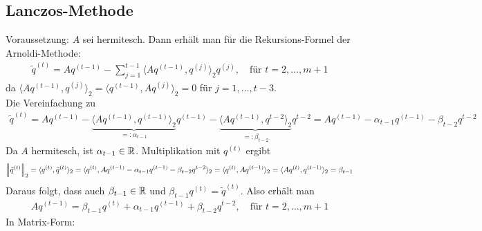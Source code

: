 \subsection{Lanczos-Methode}
Voraussetzung: $A$ sei hermitesch. Dann erhält man für die Rekursions-Formel der Arnoldi-Methode:
\begin{align*}
  \tilde{q}^{(t)} = Aq^{(t-1)} - \sum_{j=1}^{t-1} \langle Aq^{(t-1)}, q^{(j)}\rangle_2 q^{(j)}, \quad \text{für } t=2,\dots,m+1
\end{align*}
da $\langle Aq^{(t-1)}, q^{(j)}\rangle_2 = \langle q^{(t-1)}, Aq^{(j)}\rangle_2 = 0$ für $j=1,\dots,t-3$. \\
Die Vereinfachung zu 
\begin{align*}\tilde{q}^{(t)} = Aq^{(t-1)} - \underbrace{\langle Aq^{(t-1)}, q^{(t-1)}\rangle_2}_{=:\alpha_{t-1}} q^{(t-1)}
- \underbrace{\langle Aq^{(t-1)}, q^{t-2}\rangle_2}_{=:\beta_{t-2}} q^{t-2} = Aq^{(t-1)}-\alpha_{t-1}q^{(t-1)}-\beta_{t-2}q^{t-2}\end{align*}
Da $A$ hermitesch, ist $\alpha_{t-1}\in\mathbb R$. Multiplikation mit $q^{(t)}$ ergibt
\begin{align*}
  \vertn{2}{\tilde{q}^{(t)}}_2 = \langle q^{(t)}, \tilde{q}^{(t)}\rangle_2 = \langle q^{(t)}, Aq^{(t-1)}-\alpha_{t-1}q^{(t-1)}-\beta_{t-2}q^{t-2}\rangle_2 
  = \langle q^{(t)}, Aq^{(t-1)}\rangle_2 = \langle Aq^{(t)}, q^{(t-1)}\rangle_2 = \beta_{t-1}
\end{align*}
Daraus folgt, dass auch $\beta_{t-1}\in\mathbb R$ und $\beta_{t-1}q^{(t)} = \tilde{q}^{(t)}$. Also erhält man 
\begin{align*}
  Aq^{(t-1)} = \beta_{t-1}q^{(t)} + \alpha_{t-1}q^{(t-1)} + \beta_{t-2}q^{t-2},\quad\text{für } t=2,\dots,m+1
\end{align*}
In Matrix-Form:

